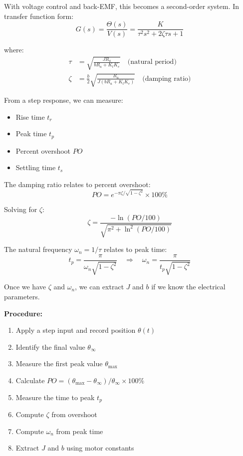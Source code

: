 With voltage control and back-EMF, this becomes a second-order system. In transfer function form:
\begin{equation}
G(s) = \frac{\Theta(s)}{V(s)} = \frac{K}{\tau^2 s^2 + 2\zeta\tau s + 1}
\end{equation}

where:
\begin{align}
\tau &= \sqrt{\frac{JR_a}{bR_a + K_tK_e}} \quad \text{(natural period)} \\
\zeta &= \frac{b}{2}\sqrt{\frac{R_a}{J(bR_a + K_tK_e)}} \quad \text{(damping ratio)}
\end{align}

From a step response, we can measure:
\begin{itemize}
    \item Rise time $t_r$
    \item Peak time $t_p$
    \item Percent overshoot $PO$
    \item Settling time $t_s$
\end{itemize}

The damping ratio relates to percent overshoot:
\begin{equation}
PO = e^{-\pi\zeta/\sqrt{1-\zeta^2}} \times 100\%
\end{equation}

Solving for $\zeta$:
\begin{equation}
\zeta = \frac{-\ln(PO/100)}{\sqrt{\pi^2 + \ln^2(PO/100)}}
\end{equation}

The natural frequency $\omega_n = 1/\tau$ relates to peak time:
\begin{equation}
t_p = \frac{\pi}{\omega_n\sqrt{1-\zeta^2}} \quad \Rightarrow \quad \omega_n = \frac{\pi}{t_p\sqrt{1-\zeta^2}}
\end{equation}

Once we have $\zeta$ and $\omega_n$, we can extract $J$ and $b$ if we know the electrical parameters.

\textbf{Procedure:}
\begin{enumerate}
    \item Apply a step input and record position $\theta(t)$
    \item Identify the final value $\theta_{\infty}$
    \item Measure the first peak value $\theta_{\max}$
    \item Calculate $PO = (\theta_{\max} - \theta_{\infty})/\theta_{\infty} \times 100\%$
    \item Measure the time to peak $t_p$
    \item Compute $\zeta$ from overshoot
    \item Compute $\omega_n$ from peak time
    \item Extract $J$ and $b$ using motor constants
\end{enumerate}

